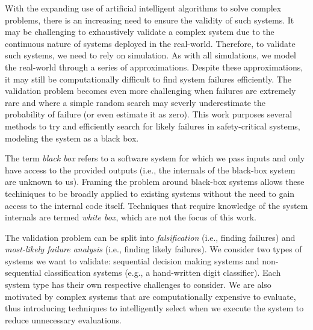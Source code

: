 
With the expanding use of artificial intelligent algorithms to solve complex problems, there is an increasing need to ensure the validity of such systems. %
It may be challenging to exhaustively validate a complex system due to the continuous nature of systems deployed in the real-world.
Therefore, to validate such systems, we need to rely on simulation.
As with all simulations, we model the real-world through a series of approximations.
Despite these approximations, it may still be computationally difficult to find system failures efficiently.
The validation problem becomes even more challenging when failures are extremely rare and where a simple random search may severly underestimate the probability of failure (or even estimate it as zero).
This work purposes several methods to try and efficiently search for likely failures in safety-critical systems, modeling the system as a black box.


The term \textit{black box} refers to a software system for which we pass inputs and only have access to the provided outputs (i.e., the internals of the black-box system are unknown to us).
Framing the problem around black-box systems allows these techiniques to be broadly applied to existing systems without the need to gain access to the internal code itself. 
Techniques that require knowledge of the system internals are termed \textit{white box}, which are not the focus of this work. 

The validation problem can be split into \textit{falsification} (i.e., finding failures) and \textit{most-likely failure analysis} (i.e., finding likely failures). 
We consider two types of systems we want to validate: sequential decision making systems and non-sequential classification systems (e.g., a hand-written digit classifier).
Each system type has their own respective challenges to consider.
We are also motivated by complex systems that are computationally expensive to evaluate, thus introducing techniques to intelligently select when we execute the system to reduce unnecessary evaluations. 

